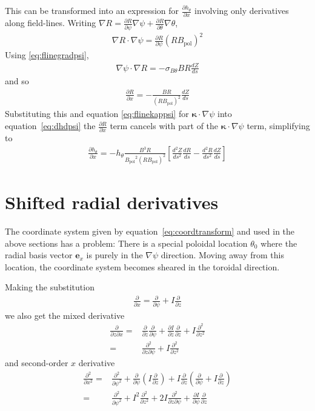\documentclass[12pt]{article}
\newcommand{\sbt}{\ensuremath{\sigma_{B\theta}}}
\newcommand{\deriv}[2]{\ensuremath{\frac{\partial #1}{\partial #2}}}
\newcommand{\hthe}{\ensuremath{h_\theta}}
\newcommand{\Bp}{\ensuremath{B_{\text{pol}}}}
\newcommand{\ve}[1]{\ensuremath{\boldsymbol{#1}}}
\newcommand{\kvec}{\ve{\kappa}}
\newcommand{\rbp}{\ensuremath{R\Bp}}
\newcommand{\rbpsq}{\ensuremath{\left(\rbp\right)^2}}
\begin{document}
This can be transformed into an expression for $\deriv{\hthe}{x}$ involving
only derivatives along
field-lines.
Writing $\nabla R = \deriv{R}{\psi}\nabla\psi + \deriv{R}{\theta}\nabla\theta$,
%
\begin{align*}
\nabla R \cdot \nabla\psi = \deriv{R}{\psi}\rbpsq
\end{align*}
%
Using \ref{eq:flinegradpsi},
%
\begin{align*}
\nabla\psi \cdot \nabla R = -\sbt B R\frac{dZ}{ds}
\end{align*}
%
and so
%
\begin{align*}
\deriv{R}{x} = -\frac{BR}{\rbpsq}\frac{dZ}{ds}
\end{align*}
%
Substituting this and equation \ref{eq:flinekappsi} for $\kvec\cdot\nabla\psi$
into equation~\ref{eq:dhdpsi}
the $\deriv{R}{x}$ term cancels with part of the $\kvec\cdot\nabla\psi$ term,
simplifying to
%
\begin{align*}
\deriv{\hthe}{x} =
-\hthe\frac{B^3R}{\Bp^2\rbpsq}\left[\frac{d^2Z}{ds^2}\frac{dR}{ds} -
\frac{d^2R}{ds^2}\frac{dZ}{ds}\right]
\end{align*}



\section{Shifted radial derivatives}
\label{sec:shiftcoords}
The coordinate system given by equation~\ref{eq:coordtransform} and used in the
above sections has a problem: There is a special poloidal location $\theta_0$
where the radial basis vector $\ve{e}_x$ is purely in the $\nabla\psi$
direction.
Moving away from this location, the coordinate system becomes sheared in 
the toroidal direction.

Making the substitution
%
\begin{align*}
\deriv{}{x} = \deriv{}{\psi} + I\deriv{}{z}
\end{align*}
%
we also get the mixed derivative
%
\begin{align*}
\frac{\partial}{\partial z\partial x} =& \deriv{}{z}\deriv{}{\psi} + 
\deriv{I}{z}\deriv{}{z} + I\frac{\partial^2}{\partial z^2} \nonumber \\
=& \frac{\partial^2}{\partial z\partial \psi} + I\frac{\partial^2}{\partial 
z^2}
\end{align*}
%
and second-order $x$ derivative
%
\begin{align*}
\frac{\partial^2}{\partial x^2} =& \frac{\partial^2}{\partial \psi^2} + 
\deriv{}{\psi}\left(I\deriv{}{z}\right) + I\deriv{}{z}\left(\deriv{}{\psi} + 
I\deriv{}{z}\right) \nonumber \\
=& \frac{\partial^2}{\partial \psi^2} + I^2\frac{\partial^2}{\partial z^2} + 
2I\frac{\partial^2}{\partial z\partial \psi} + \deriv{I}{\psi}\deriv{}{z}
\end{align*}
\end{document}
